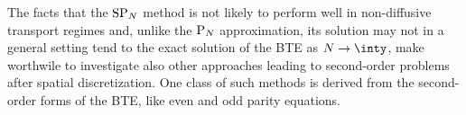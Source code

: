 The facts that the $\mathrm{SP}_{N}$ method is not likely to perform well in non-diffusive transport regimes and, unlike the $\mathrm{P}_{N}$ approximation, its solution may not in a general setting tend to the exact solution of the BTE as $N\to\inty$, make worthwile to investigate also other approaches leading to second-order problems after spatial discretization. One class of such methods is derived from the second-order forms of the BTE, like even and odd parity equations. 


